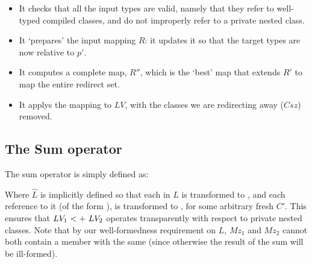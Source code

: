 \begin{itemize}
\begin{itemize}
		\item It checks that all the input types are valid, namely that they refer to well-typed compiled classes, and do not improperly refer to a private nested class.
		\item It `prepares' the input mapping $R$: it updates it so that the target types are now relative to $p'$.
		\item It computes a complete map, $R''$, which is the `best' map that extends  $R'$ to map the entire redirect set.
		\item It applys the mapping to $LV$, with the classes we are redirecting away ($Csz$) removed.
	\end{itemize}
\end{itemize}

\subsection{The Sum operator}
The sum operator is simply defined as:

\begin{defs}
{}
{}
\end{defs}
Where $\widehat{L}$ is implicitly defined so that each  in $L$ is transformed to , and each reference to it (of the form ), is transformed to , for some arbitrary fresh $C'$. This ensures that $\summ{LV_1}{LV_2}$ operates transparently with respect to private nested classes. Note that by our well-formedness requirement on $L$, $Mz_1$ and $Mz_2$ cannot both contain a member with the same \Id (since otherwise the result of the sum will be ill-formed).

